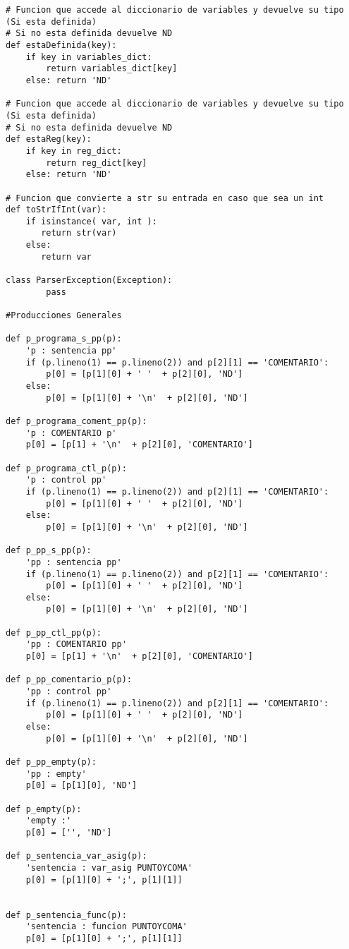 \begin{verbatim}
# Funcion que accede al diccionario de variables y devuelve su tipo (Si esta definida)
# Si no esta definida devuelve ND
def estaDefinida(key):
	if key in variables_dict:
		return variables_dict[key]
	else: return 'ND'

# Funcion que accede al diccionario de variables y devuelve su tipo (Si esta definida)
# Si no esta definida devuelve ND
def estaReg(key):
    if key in reg_dict:
        return reg_dict[key]
    else: return 'ND'

# Funcion que convierte a str su entrada en caso que sea un int
def toStrIfInt(var):
    if isinstance( var, int ):
       return str(var)
    else:
       return var

class ParserException(Exception):
        pass

#Producciones Generales

def p_programa_s_pp(p):
    'p : sentencia pp'
    if (p.lineno(1) == p.lineno(2)) and p[2][1] == 'COMENTARIO':    	
        p[0] = [p[1][0] + ' '  + p[2][0], 'ND']
    else:
        p[0] = [p[1][0] + '\n'  + p[2][0], 'ND']

def p_programa_coment_pp(p):
    'p : COMENTARIO p'
    p[0] = [p[1] + '\n'  + p[2][0], 'COMENTARIO']

def p_programa_ctl_p(p):
    'p : control pp'
    if (p.lineno(1) == p.lineno(2)) and p[2][1] == 'COMENTARIO':    	
        p[0] = [p[1][0] + ' '  + p[2][0], 'ND']
    else:
        p[0] = [p[1][0] + '\n'  + p[2][0], 'ND']

def p_pp_s_pp(p):
    'pp : sentencia pp'
    if (p.lineno(1) == p.lineno(2)) and p[2][1] == 'COMENTARIO':    	
        p[0] = [p[1][0] + ' '  + p[2][0], 'ND']
    else:
        p[0] = [p[1][0] + '\n'  + p[2][0], 'ND']

def p_pp_ctl_pp(p):
    'pp : COMENTARIO pp'
    p[0] = [p[1] + '\n'  + p[2][0], 'COMENTARIO']

def p_pp_comentario_p(p):
    'pp : control pp'
    if (p.lineno(1) == p.lineno(2)) and p[2][1] == 'COMENTARIO':    	
        p[0] = [p[1][0] + ' '  + p[2][0], 'ND']
    else:
        p[0] = [p[1][0] + '\n'  + p[2][0], 'ND']

def p_pp_empty(p):
    'pp : empty'
    p[0] = [p[1][0], 'ND']

def p_empty(p):
    'empty :'
    p[0] = ['', 'ND']
     
def p_sentencia_var_asig(p):
    'sentencia : var_asig PUNTOYCOMA'
    p[0] = [p[1][0] + ';', p[1][1]]


def p_sentencia_func(p):
    'sentencia : funcion PUNTOYCOMA'
    p[0] = [p[1][0] + ';', p[1][1]]


\end{verbatim}
